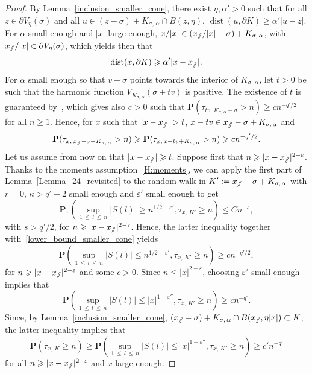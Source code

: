 \documentclass[AHL,Unicode,longabstracts,published]{cedram}
\DeclareMathOperator{\dist}{dist}
\newcommand{\pr}{\mathbf{P}}
\renewcommand{\epsilon}{\varepsilon}
\renewcommand{\leq}{\leqslant}
\renewcommand{\geq}{\geqslant}
\newcommand{\sslash}{\slash\mkern-6.4mu\slash}
\begin{document}
\begin{proof}
By Lemma~\ref{inclusion_smaller_cone}, there exist $\eta,\alpha'>0$ such that for all $z\in \partial V_{\eta}(\sigma)$ and all $u\in (z-\sigma)+K_{\sigma,\,\alpha}\cap B(z,\eta)$, $\dist(u,\partial K)\geq \alpha'| u-z|$. For $\alpha$ small enough and $| x|$ large enough, $x/| x|\in (x_{\sslash}/| x|-\sigma)+K_{\sigma,\,\alpha}$, with $x_{\sslash}/| x|\in \partial V_{\eta}(\sigma)$, which yields then that
\begin{equation}\label{linear_distance_boundary}
\dist(x,\partial K)\geq \alpha'| x-x_{\sslash}|.
\end{equation}
For $\alpha$ small enough so that $v+\sigma$ points towards the interior of $K_{\sigma,\,\alpha}$, let $t>0$ be such that the harmonic function $V_{K_{\sigma,\,\alpha}}(\sigma+tv)$ is positive. The existence of $t$ is guaranteed by~\cite[Theorem~1]{DeWa-15}, which gives also $c>0$ such that $\pr(\tau_{tv,\,K_{\sigma,\,\alpha}-\sigma}>n)\geq cn^{-q'/2}$ for all $n\geq 1$. Hence, for $x$ such that $| x-x_{\sslash}|>t$, $x-tv\in x_{\sslash}-\sigma+K_{\sigma,\,\alpha}$ and
\begin{equation}\label{lower_bound_smaller_cone}
\pr(\tau_{x,\,x_{\sslash}-\sigma+K_{\sigma,\,\alpha}}>n)\geq \pr(\tau_{x,\,x-tv+K_{\sigma,\,\alpha}}>n)\geq cn^{-q'/2}.
\end{equation}
Let us assume from now on that $|x-x_{\sslash}| \geq t$. Suppose first that $n\geq | x-x_{\sslash}|^{2-\epsilon}$. Thanks to the moments assumption~\eqref{H:moments}, we can apply the first part of Lemma~\ref{Lemma_24_revisited} to the random walk in $ K':=x_{\sslash}-\sigma+K_{\sigma,\,\alpha}$ with $r=0$, $\kappa>q'+2$ small enough and $\epsilon'$ small enough to get
\[
\pr;\left(\sup_{1\,\leq\,l\,\leq\,n}|S(l)|\geq n^{1/2+\epsilon'}, \tau_{x,\,K'}\geq n\right)\leq Cn^{-s},
\]
with $s>q'/2$, for $n\geq |x-x_{\sslash}|^{2-\epsilon}$. Hence, the latter inequality together with~\eqref{lower_bound_smaller_cone} yields
\[
\pr\left(\sup_{1\,\leq\,l\,\leq\,n}|S(l)|\leq n^{1/2+\epsilon'}, \tau_{x,\,K'}\geq n\right)\geq cn^{-q'/2},
\]
for $n\geq |x-x_{\sslash}|^{2-\epsilon}$ and some $c>0$. Since $n\leq | x|^{2-\epsilon}$, choosing $\epsilon'$ small enough implies that
\[
\pr\left(\sup_{1\,\leq\,l\,\leq\,n}|S(l)|\leq |x|^{1-\epsilon''}, \tau_{x,\,K'}\geq n\right)\geq cn^{-q'}.
\]
Since, by Lemma~\ref{inclusion_smaller_cone}, $(x_{\sslash}-\sigma)+K_{\sigma,\,\alpha}\cap B(x_{\sslash},\eta |x|)\subset K$, the latter inequality implies that
\[
\pr\left(\tau_{x,\,K}\geq n\right)\geq \pr\left(\sup_{1\,\leq\,l\,\leq\,n}|S(l)|\leq |x|^{1-\epsilon''}, \tau_{x,\,K'}\geq n\right)\geq c'n^{-q'}
\]
for all $n\geq |x-x_{\sslash}|^{2-\epsilon}$ and $x$ large enough.


\end{proof}
\end{document}
